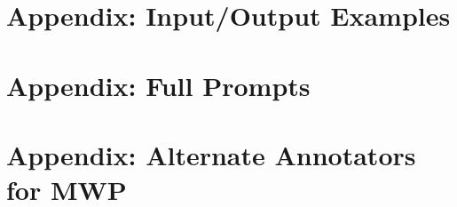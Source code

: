 \documentclass[]{article}
\theoremstyle{plain}
\theoremstyle{definition}
\theoremstyle{remark}
\begin{document}
\clearpage
\section{Appendix: Input/Output Examples}\label{sec:appendix-input-output-examples}








\clearpage
\section{Appendix: Full Prompts}\label{sec:appendix-full-prompts}











\clearpage
\section{Appendix: Alternate Annotators for MWP}\label{sec:appendix-alternate-annotators}


\newpage

\end{document}
